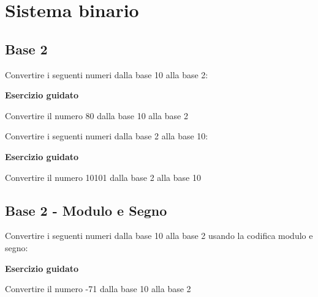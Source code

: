 \documentclass[11pt,fleqn]{book}
\begin{document}

\chapter{Sistema binario}

\section{Base 2}

Convertire i seguenti numeri dalla base 10 alla base 2:

\begin{esercizio}[1]
    \textbf{Esercizio guidato}

    Convertire il numero 80 dalla base 10 alla base 2

    \immediate{}
    

\end{esercizio}


\newpage

\noindent
Convertire i seguenti numeri dalla base 2 alla base 10:

\vspace{0.5cm}

\begin{esercizio}[1]
    \textbf{Esercizio guidato}

    Convertire il numero 10101 dalla base 2 alla base 10

    \immediate{}
    

\end{esercizio}


\newpage

\section{Base 2 - Modulo e Segno}

Convertire i seguenti numeri dalla base 10 alla base 2 usando la codifica modulo e segno:

\begin{esercizio}[1]
    \textbf{Esercizio guidato}

    Convertire il numero -71 dalla base 10 alla base 2

    \immediate{}
    

\end{esercizio}
\end{document}
